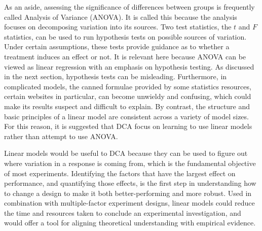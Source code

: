 \documentclass[11pt,a4paper,article]{memoir} %
\begin{document}
As an aside, assessing the significance of differences between groups is frequently called Analysis of Variance (ANOVA). It is called this because the analysis focuses on decomposing variation into its sources. Two test statistics, the $t$ and $F$ statistics, can be used to run hypothesis tests on possible sources of variation. Under certain assumptions, these tests provide guidance as to whether a treatment induces an effect or not. It is relevant here because ANOVA can be viewed as linear regression with an emphasis on hypothesis testing. As discussed in the next section, hypothesis tests can be misleading. Furthermore, in complicated models, the canned formulae provided by some statistics resources, certain websites in particular, can become unwieldy and confusing, which could make its results suspect and difficult to explain. By contrast, the structure and basic principles of a linear model are consistent across a variety of model sizes. For this reason, it is suggested that DCA focus on learning to use linear models rather than attempt to use ANOVA.

Linear models would be useful to DCA because they can be used to figure out where variation in a response is coming from, which is the fundamental objective of most experiments. Identifying the factors that have the largest effect on performance, and quantifying those effects, is the first step in understanding how to change a design to make it both better-performing and more robust. Used in combination with multiple-factor experiment designs, linear models could reduce the time and resources taken to conclude an experimental investigation, and would offer a tool for aligning theoretical understanding with empirical evidence.

\newpage
\end{document}
